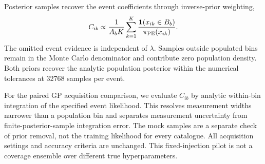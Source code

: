 Posterior samples recover the event coefficients through inverse-prior weighting,
\begin{equation}
 C_{ib}\propto\frac{1}{A_b K}\sum_{k=1}^{K}
 \frac{\mathbf 1(x_{ik}\in B_b)}{\pi_{\rm PE}(x_{ik})}.
\end{equation}
The omitted event evidence is independent of $\lambda$. Samples outside
populated bins remain in the Monte Carlo denominator and contribute zero
population density. Both priors recover the analytic population posterior
within the numerical tolerances at 32768 samples per event.

For the paired GP acquisition comparison, we evaluate $C_{ib}$ by analytic
within-bin integration of the specified event likelihood. This resolves
measurement widths narrower than a population bin and separates measurement
uncertainty from finite-posterior-sample integration error. The mock samples
are a separate check of prior removal, not the training likelihood for every
catalogue. All acquisition settings and accuracy criteria are unchanged.
This fixed-injection pilot is not a coverage ensemble over different true
hyperparameters.

